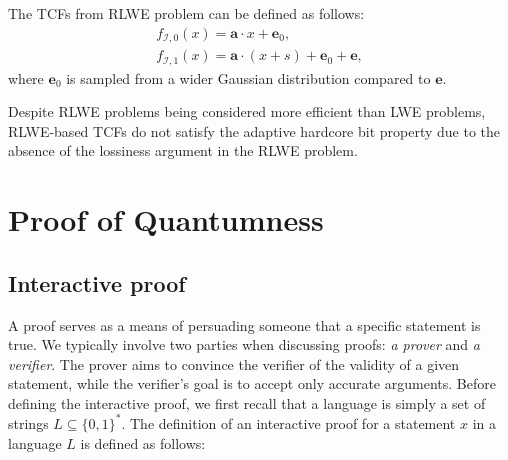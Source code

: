 \documentclass[cryptography,review,submit,pdftex,moreauthors,amsmath,amssymb,aps,strict]{Definitions/mdpi}
\begin{document}
The TCFs from RLWE problem can be defined as follows:
\begin{align}
    f_{\mathcal{I},0}(x)=\mathbf{a}\cdot x+\mathbf{e}_0,\\
    f_{\mathcal{I},1}(x)=\mathbf{a}\cdot (x+s)+\mathbf{e}_0+\mathbf{e},
\end{align}
where $\mathbf{e}_0$ is sampled from a wider Gaussian distribution compared to $\mathbf{e}$. 

Despite RLWE problems being considered more efficient than LWE problems, RLWE-based TCFs do not satisfy the adaptive hardcore bit property due to the absence of the lossiness argument in the RLWE problem. 
\section{Proof of Quantumness} \label{proof_of_quantumness}

\subsection{Interactive proof}
A proof serves as a means of persuading someone that a specific statement is true. We typically involve two parties when discussing proofs: \textit{a prover} and \textit{a verifier}. The prover aims to convince the verifier of the validity of a given statement, while the verifier's goal is to accept only accurate arguments. Before defining the interactive proof, we first recall that a language is simply a set of strings $L\subseteq \{0,1\}^*$. The definition of an interactive proof for a statement $x$ in a language $L$ is defined as follows:
\end{document}
